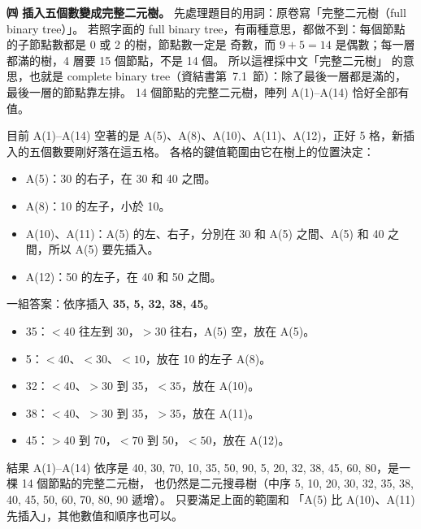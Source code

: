 \begin{pastsoln}
\textbf{㈣ 插入五個數變成完整二元樹。} 先處理題目的用詞：原卷寫「完整二元樹（full binary tree）」。
若照字面的 full binary tree，有兩種意思，都做不到：每個節點的子節點數都是 0 或 2 的樹，節點數一定是
奇數，而 $9 + 5 = 14$ 是偶數；每一層都滿的樹，4 層要 15 個節點，不是 14 個。 所以這裡採中文「完整二元樹」
的意思，也就是 complete binary tree（資結書第~7.1~節）：除了最後一層都是滿的，最後一層的節點靠左排。
14 個節點的完整二元樹，陣列 A(1)--A(14) 恰好全部有值。

目前 A(1)--A(14) 空著的是 A(5)、A(8)、A(10)、A(11)、A(12)，正好 5 格，新插入的五個數要剛好落在這五格。
各格的鍵值範圍由它在樹上的位置決定：
\begin{itemize}
\item A(5)：30 的右子，在 30 和 40 之間。
\item A(8)：10 的左子，小於 10。
\item A(10)、A(11)：A(5) 的左、右子，分別在 30 和 A(5) 之間、A(5) 和 40 之間，所以 A(5) 要先插入。
\item A(12)：50 的左子，在 40 和 50 之間。
\end{itemize}
一組答案：依序插入 \textbf{35, 5, 32, 38, 45}。
\begin{itemize}
\item 35：$< 40$ 往左到 30，$> 30$ 往右，A(5) 空，放在 A(5)。
\item 5：$< 40$、$< 30$、$< 10$，放在 10 的左子 A(8)。
\item 32：$< 40$、$> 30$ 到 35，$< 35$，放在 A(10)。
\item 38：$< 40$、$> 30$ 到 35，$> 35$，放在 A(11)。
\item 45：$> 40$ 到 70，$< 70$ 到 50，$< 50$，放在 A(12)。
\end{itemize}
結果 A(1)--A(14) 依序是 40, 30, 70, 10, 35, 50, 90, 5, 20, 32, 38, 45, 60, 80，是一棵 14 個節點的完整二元樹，
也仍然是二元搜尋樹（中序 5, 10, 20, 30, 32, 35, 38, 40, 45, 50, 60, 70, 80, 90 遞增）。 只要滿足上面的範圍和
「A(5) 比 A(10)、A(11) 先插入」，其他數值和順序也可以。
\end{pastsoln}
